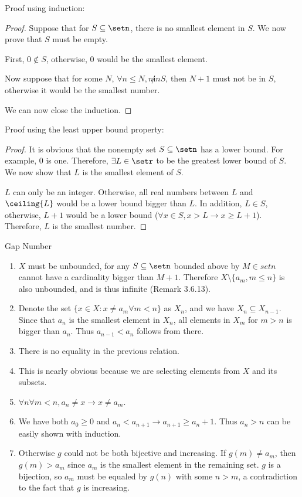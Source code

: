 Proof using induction:
\begin{proof}
Suppose that for $S \subseteq \setn$, there is no smallest element in $S$. We now prove that $S$ must be empty.

First, $0 \notin S$, otherwise, 0 would be the smallest element.

Now suppose that for some $N$, $\forall n \le N, n \not in S$, then $N+1$ must not be in $S$, otherwise it would be the smallest number.

We can now close the induction.
\end{proof}

Proof using the least upper bound property:
\begin{proof}
It is obvious that the nonempty set $S \subseteq \setn$ has a lower bound. For example, $0$ is one. Therefore, $\exists L \in \setr$ to be the greatest lower bound of $S$. We now show that $L$ is the smallest element of $S$.

$L$ can only be an integer. Otherwise, all real numbers between $L$ and $\ceiling{L}$ would be a lower bound bigger than $L$. In addition, $L \in S$, otherwise, $L+1$ would be a lower bound ($\forall x \in S, x>L \to x \ge L+1$). Therefore, $L$ is the smallest number.
\end{proof}

Gap Number
\begin{enumerate}
\item $X$ must be unbounded, for any $S \subseteq \setn$ bounded above by $M \in setn$ cannot have a cardinality bigger than $M+1$. Therefore $X\setminus\{a_m,m\le n\}$ is also unbounded, and is thus infinite (Remark 3.6.13).
\item Denote the set $\{x \in X: x \neq a_m \forall m < n\}$ as $X_n$, and we have $X_{n} \subseteq X_{n-1}$. Since that $a_n$ is the smallest element in $X_n$, all elements in $X_m$ for $m > n$ is bigger than $a_n$. Thus $a_{n-1} < a_n$ follows from there.
\item There is no equality in the previous relation.
\item This is nearly obvious because we are selecting elements from $X$ and its subsets.
\item $\forall n \forall m < n, a_n \ne x \to x \ne a_m$.
\item We have both $a_0 \ge 0$ and $a_n < a_{n+1} \to a_{n+1} \ge a_n + 1$. Thus $a_n > n$ can be easily shown with induction.
\item Otherwise $g$ could not be both bijective and increasing. If $g(m) \ne a_m$, then $g(m) > a_m$ since $a_m$ is the smallest element in the remaining set. $g$ is a bijection, so $a_m$ must be equaled by $g(n)$ with some $n > m$, a contradiction to the fact that $g$ is increasing.  
\end{enumerate}

